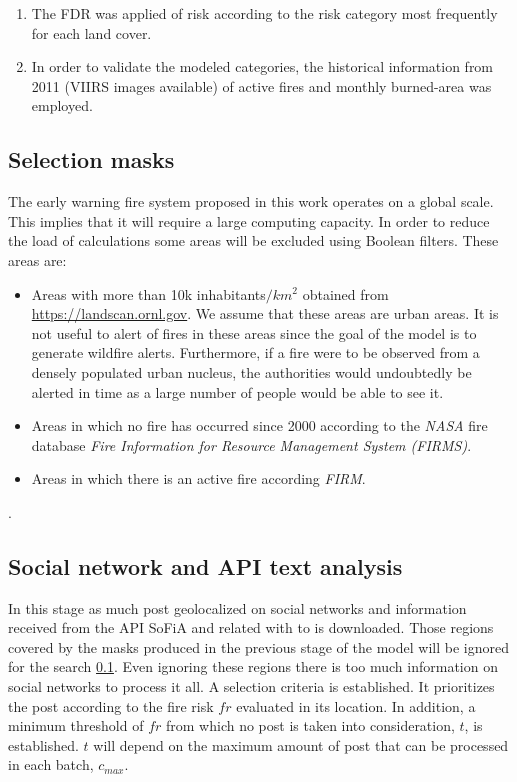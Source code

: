 \documentclass{article}
\begin{document}
\begin{enumerate}
    \item The FDR was applied of risk according to the risk category most frequently for each land cover. 
    
    \item In order to validate the modeled categories, the historical information from 2011 (VIIRS images available) of active fires and monthly burned-area was employed.

\end{enumerate}

\subsection{Selection masks} \label{masks}

The early warning fire system proposed in this work operates on a global scale.
This implies that it will require a large computing capacity.
In order to reduce the load of calculations some areas will be excluded using Boolean filters.
These areas are:
\begin{itemize}
	\item Areas with more than 10k inhabitants$/km^2$ obtained from \url{https://landscan.ornl.gov}.
We assume that these areas are urban areas.
It is not useful to alert of fires in these areas since the goal of the model is to generate wildfire alerts.
Furthermore, if a fire were to be observed from a densely populated urban nucleus, the authorities would undoubtedly be alerted in time as a large number of people would be able to see it.
	\item Areas in which no fire has occurred since 2000 according to the \textit{NASA} fire database \textit{Fire Information for Resource Management System (FIRMS)}.
	\item Areas in which there is an active fire according \textit{FIRM}.
\end{itemize}.

\subsection{Social network and API text analysis}

In this stage as much post geolocalized on social networks and information received from the API SoFiA and related with to is downloaded.
Those regions covered by the masks produced in the previous stage of the model will be ignored for the search \ref{masks}.
Even ignoring these regions there is too much information on social networks to process it all.
A selection criteria is established.
It prioritizes the post according to the fire risk $fr$ evaluated in its location.
In addition, a minimum threshold of $fr$ from which no post is taken into consideration, $t$, is established.
$t$ will depend on the maximum amount of post that can be processed in each batch, $c_{max}$.
\end{document}
